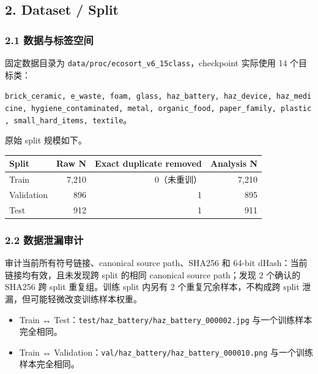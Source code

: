 \documentclass[
  a4paper,
]{article}
\providecommand{\tightlist}{%
  \setlength{\itemsep}{0pt}\setlength{\parskip}{0pt}}
\begin{document}
\hypertarget{2-dataset--split}{%
\subsection{2. Dataset / Split}\label{2-dataset--split}}

\hypertarget{21-ux6570ux636eux4e0eux6807ux7b7eux7a7aux95f4}{%
\subsubsection{2.1
数据与标签空间}\label{21-ux6570ux636eux4e0eux6807ux7b7eux7a7aux95f4}}

固定数据目录为 \texttt{data/proc/ecosort\_v6\_15class}，checkpoint
实际使用 14 个目标类：

\texttt{brick\_ceramic,\ e\_waste,\ foam,\ glass,\ haz\_battery,\ haz\_device,\ haz\_medicine,\ hygiene\_contaminated,\ metal,\ organic\_food,\ paper\_family,\ plastic,\ small\_hard\_items,\ textile}。

原始 split 规模如下。

\begingroup
\small
\setlength{\tabcolsep}{3pt}
\begin{longtable}[]{@{}lrrr@{}}
\toprule
Split & Raw N & Exact duplicate removed & Analysis N \\
\midrule
\endhead
Train & 7,210 & 0（未重训） & 7,210 \\
Validation & 896 & 1 & 895 \\
Test & 912 & 1 & 911 \\
\bottomrule
\end{longtable}
\endgroup

\hypertarget{22-ux6570ux636eux6cc4ux6f0fux5ba1ux8ba1}{%
\subsubsection{2.2
数据泄漏审计}\label{22-ux6570ux636eux6cc4ux6f0fux5ba1ux8ba1}}

审计当前所有符号链接、canonical source path、SHA256 和 64-bit
dHash：当前链接均有效，且未发现跨 split 的相同 canonical source
path；发现 2 个确认的 SHA256 跨 split 重复组。训练 split 内另有 2
个重复冗余样本，不构成跨 split 泄漏，但可能轻微改变训练样本权重。

\begin{itemize}
\tightlist
\item
  Train ↔ Test：\texttt{test/haz\_battery/haz\_battery\_000002.jpg}
  与一个训练样本完全相同。
\item
  Train ↔ Validation：\texttt{val/haz\_battery/haz\_battery\_000010.png}
  与一个训练样本完全相同。
\end{itemize}
\end{document}
